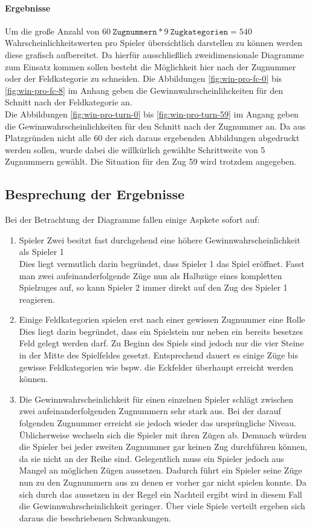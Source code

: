 \paragraph{Ergebnisse}
Um die große Anzahl von $60\ \mathtt{Zugnummern} * 9\ \mathtt{Zugkategorien} = 540$ Wahrscheinlichkeitswerten pro Spieler übersichtlich darstellen zu können werden diese grafisch aufbereitet. Da hierfür ausschließlich zweidimensionale Diagramme zum Einsatz kommen sollen besteht die Möglichkeit hier nach der Zugnummer oder der Feldkategorie zu schneiden. Die Abbildungen \ref{fig:win-pro-fc-0} bis \ref{fig:win-pro-fc-8} im Anhang geben die Gewinnwahrscheinlihckeiten für den Schnitt nach der Feldkategorie an.
\\Die Abbildungen \ref{fig:win-pro-turn-0} bis \ref{fig:win-pro-turn-59} im Angang geben die Gewinnwahrscheinlichkeiten für den Schnitt nach der Zugnummer an. Da aus Platzgründen nicht alle 60 der sich daraus ergebenden Abbildungen abgedruckt werden sollen, wurde dabei die willkürlich gewählte Schrittweite von 5 Zugnummern gewählt. Die Situation für den Zug 59 wird trotzdem angegeben.

\subsection{Besprechung der Ergebnisse}
Bei der Betrachtung der Diagramme fallen einige Aspkete sofort auf:
\begin{enumerate}
\item Spieler Zwei besitzt fast durchgehend eine höhere Gewinnwahrscheinlichkeit als Spieler 1
\\Dies liegt vermutlich darin begründet, dass Spieler 1 das Spiel eröffnet. Fasst man zwei aufeinanderfolgende Züge nun als Halbzüge eines kompletten Spielzuges auf, so kann Spieler 2 immer direkt auf den Zug des Spieler 1 reagieren.
\item Einige Feldkategorien spielen erst nach einer gewissen Zugnummer eine Rolle
\\Dies liegt darin begründet, dass ein Spielstein nur neben ein bereits besetzes Feld gelegt werden darf. Zu Beginn des Spiels sind jedoch nur die vier Steine in der Mitte des Spielfeldes gesetzt. Entsprechend dauert es einige Züge bis gewisse Feldkategorien wie bspw. die Eckfelder überhaupt erreicht werden können.
\item Die Gewinnwahrscheinlichkeit für einen einzelnen Spieler schlägt zwischen zwei aufeinanderfolgenden Zugnummern sehr stark aus. Bei der darauf folgenden Zugnummer erreicht sie jedoch wieder das ursprüngliche Niveau.
\\Üblicherweise wechseln sich die Spieler mit ihren Zügen ab. Demnach würden die Spieler bei jeder zweiten Zugnummer gar keinen Zug durchführen können, da sie nicht an der Reihe sind. Gelegentlich muss ein Spieler jedoch aus Mangel an möglichen Zügen aussetzen. Dadurch führt ein Spieler seine Züge nun zu den Zugnummern aus zu denen er vorher gar nicht spielen konnte. Da sich durch das aussetzen in der Regel ein Nachteil ergibt wird in diesem Fall die Gewinnwahrscheinlichkeit geringer. Über viele Spiele verteilt ergeben sich daraus die beschriebenen Schwankungen.
\end{enumerate}
